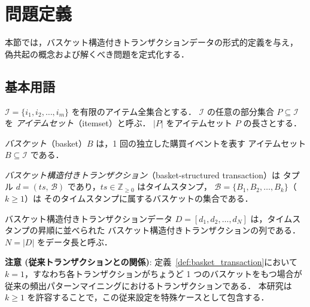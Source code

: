\section{問題定義}
\label{sec:problem_def}

本節では，バスケット構造付きトランザクションデータの形式的定義を与え，
偽共起の概念および解くべき問題を定式化する．

\subsection{基本用語}

\begin{definition}
\label{def:item}
$\mathcal{I} = \{i_1, i_2, \ldots, i_m\}$ を有限のアイテム全集合とする．
$\mathcal{I}$ の任意の部分集合 $P \subseteq \mathcal{I}$ を
\emph{アイテムセット}（itemset）と呼ぶ．
$|P|$ をアイテムセット $P$ の長さとする．
\end{definition}

\begin{definition}[バスケット]
\label{def:basket}
\emph{バスケット}（basket）$B$ は，1 回の独立した購買イベントを表す
アイテムセット $B \subseteq \mathcal{I}$ である．
\end{definition}

\begin{definition}[バスケット構造付きトランザクション]
\label{def:basket_transaction}
\emph{バスケット構造付きトランザクション}（basket-structured transaction）は
タプル $d = (ts,\, \mathcal{B})$ であり，$ts \in \mathbb{Z}_{\geq 0}$ はタイムスタンプ，
$\mathcal{B} = \{B_1, B_2, \ldots, B_k\}$（$k \geq 1$）は
そのタイムスタンプに属するバスケットの集合である．
\end{definition}

\begin{definition}[バスケット構造付きトランザクションデータ]
\label{def:basket_data}
バスケット構造付きトランザクションデータ
$D = [d_1, d_2, \ldots, d_N]$ は，タイムスタンプの昇順に並べられた
バスケット構造付きトランザクションの列である．
$N = |D|$ をデータ長と呼ぶ．
\end{definition}

\noindent
\textbf{注意 (従来トランザクションとの関係)}: 定義~\ref{def:basket_transaction}において
$k = 1$，すなわち各トランザクションがちょうど 1 つのバスケットをもつ場合が
従来の頻出パターンマイニングにおけるトランザクションである．
本研究は $k \geq 1$ を許容することで，この従来設定を特殊ケースとして包含する．

